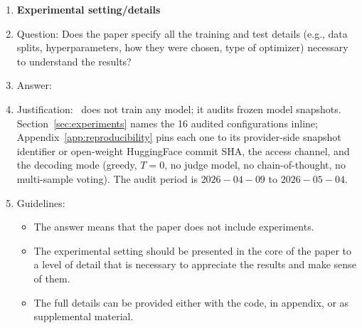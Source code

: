 \begin{enumerate}
\begin{itemize}
        \item The authors should provide instructions on data access and preparation, including how to access the raw data, preprocessed data, intermediate data, and generated data, etc.
        \item The authors should provide scripts to reproduce all experimental results for the new proposed method and baselines. If only a subset of experiments are reproducible, they should state which ones are omitted from the script and why.
        \item At submission time, to preserve anonymity, the authors should release anonymized versions (if applicable).
        \item Providing as much information as possible in supplemental material (appended to the paper) is recommended, but including URLs to data and code is permitted.
    \end{itemize}


\item {\bf Experimental setting/details}
    \item[] Question: Does the paper specify all the training and test details (e.g., data splits, hyperparameters, how they were chosen, type of optimizer) necessary to understand the results?
    \item[] Answer: \answerYes{}
    \item[] Justification: \medvigil\ does not train any model; it audits frozen model snapshots. Section~\ref{sec:experiments} names the 16 audited configurations inline; Appendix~\ref{app:reproducibility} pins each one to its provider-side snapshot identifier or open-weight HuggingFace commit SHA, the access channel, and the decoding mode (greedy, $T{=}0$, no judge model, no chain-of-thought, no multi-sample voting). The audit period is $2026{-}04{-}09$ to $2026{-}05{-}04$.
    \item[] Guidelines:
    \begin{itemize}
        \item The answer \answerNA{} means that the paper does not include experiments.
        \item The experimental setting should be presented in the core of the paper to a level of detail that is necessary to appreciate the results and make sense of them.
        \item The full details can be provided either with the code, in appendix, or as supplemental material.
    \end{itemize}


\end{enumerate}
